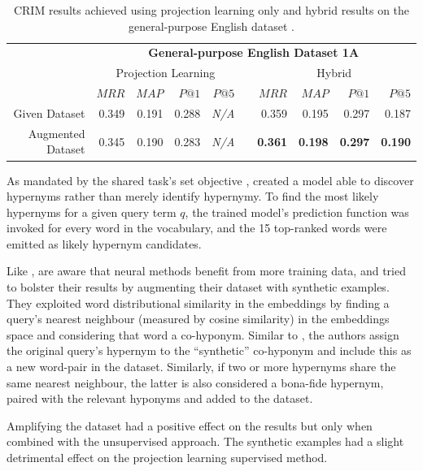 \begin{table}\centering
    \begin{tabular}{@{}rrrrrcrrrr@{}} \toprule
    & \multicolumn{9}{c}{\textbf{General-purpose English Dataset 1A}} \\ \cmidrule{2-10} 
    & \multicolumn{4}{c}{Projection Learning} & \phantom{a} & \multicolumn{4}{c}{Hybrid} \\
    \cmidrule{2-5} \cmidrule{7-10}
    & $MRR$ & $MAP$ & $P@1$ & $P@5$ && $MRR$ & $MAP$ & $P@1$ & $P@5$ \\ \midrule
    Given Dataset & 0.349 & 0.191 & 0.288 & \textit{N/A} && 0.359 & 0.195 & 0.297 & 0.187 \\
    Augmented Dataset & 0.345 & 0.190 & 0.283 & \textit{N/A} && \textbf{0.361} & \textbf{0.198} & \textbf{0.297} & \textbf{0.190} \\
    \bottomrule
    \end{tabular}
    \caption{CRIM results achieved using projection learning only and hybrid results on the general-purpose English dataset \citep{bernier2018crim}.}\label{tab:CRIM_results}
\end{table}

As mandated by the shared task's  set objective \citep{camacho2018semeval}, \citet{bernier2018crim} created a model able to discover hypernyms rather than merely identify hypernymy.  To find the most likely hypernyms for a given query term $q$, the trained model's prediction function was invoked for every word in the vocabulary, and the 15 top-ranked words were emitted as likely hypernym candidates.

Like \citep{espinosa2016supervised}, \citeauthor{bernier2018crim} are aware that neural methods benefit from more training data, and tried to bolster their results by augmenting their dataset with synthetic examples.  They exploited word distributional similarity in the embeddings by finding a query’s nearest neighbour (measured by cosine similarity) in the embeddings space and considering that word a co-hyponym.  Similar to \citep{Snow2004, ritter2009anyway}, the authors assign the original query’s hypernym to the ``synthetic'' co-hyponym and include this as a new word-pair in the dataset.  Similarly, if two or more hypernyms share the same nearest neighbour, the latter is also considered a bona-fide hypernym, paired with the relevant hyponyms and added to the dataset.  

Amplifying the dataset had a positive effect on the results but only when combined with the unsupervised approach.  The synthetic examples had a slight detrimental effect on the projection learning supervised method.

